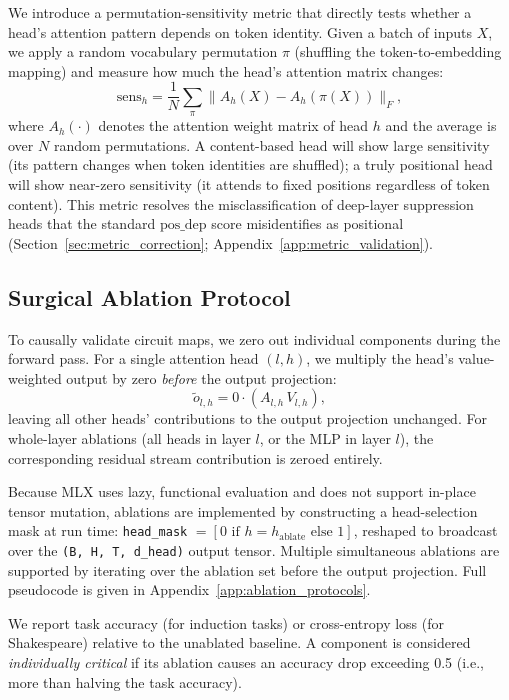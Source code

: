 We introduce a permutation-sensitivity metric that directly tests whether a head's attention pattern
depends on token identity. Given a batch of inputs $X$, we apply a random vocabulary permutation
$\pi$ (shuffling the token-to-embedding mapping) and measure how much the head's attention
matrix changes:
\begin{equation}
\label{eq:perm_sens}
\text{sens}_h = \frac{1}{N} \sum_{\pi} \|A_h(X) - A_h(\pi(X))\|_F,
\end{equation}
where $A_h(\cdot)$ denotes the attention weight matrix of head $h$ and the average is over $N$
random permutations. A content-based head will show large sensitivity (its pattern changes when
token identities are shuffled); a truly positional head will show near-zero sensitivity (it
attends to fixed positions regardless of token content). This metric resolves the misclassification
of deep-layer suppression heads that the standard $\text{pos\_dep}$ score misidentifies as
positional (Section~\ref{sec:metric_correction}; Appendix~\ref{app:metric_validation}).

\subsection{Surgical Ablation Protocol}
\label{sec:ablation}

To causally validate circuit maps, we zero out individual components during the forward pass.
For a single attention head $(l, h)$, we multiply the head's value-weighted output by zero
\emph{before} the output projection:
\begin{equation*}
\tilde{o}_{l,h} = 0 \cdot (A_{l,h}\, V_{l,h}),
\end{equation*}
leaving all other heads' contributions to the output projection unchanged. For whole-layer
ablations (all heads in layer $l$, or the MLP in layer $l$), the corresponding residual stream
contribution is zeroed entirely.

Because MLX \cite{mlx2023} uses lazy, functional evaluation and does not support in-place tensor
mutation, ablations are implemented by constructing a head-selection mask at run time:
\texttt{head\_mask} $= [0 \text{ if } h = h_{\text{ablate}} \text{ else } 1]$, reshaped to
broadcast over the \texttt{(B, H, T, d\_head)} output tensor. Multiple simultaneous ablations are
supported by iterating over the ablation set before the output projection. Full pseudocode is given
in Appendix~\ref{app:ablation_protocols}.

We report task accuracy (for induction tasks) or cross-entropy loss (for Shakespeare) relative to
the unablated baseline. A component is considered \emph{individually critical} if its ablation
causes an accuracy drop exceeding 0.5 (i.e., more than halving the task accuracy).

